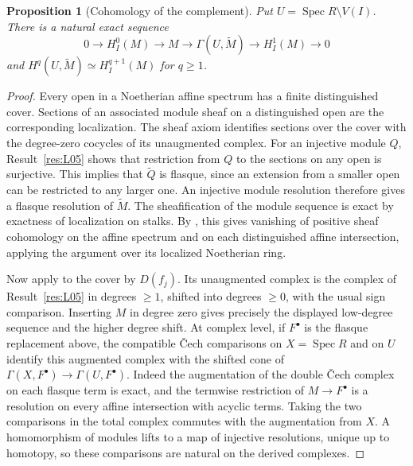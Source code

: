 \documentclass[11pt,oneside,openany]{book}
\newtheorem{proposition}[theorem]{Proposition}
\theoremstyle{definition}
\theoremstyle{remark}
\begin{document}
\begin{proposition}[Cohomology of the complement]\label{res:L10}
Put \(U=\operatorname{Spec} R\setminus V(I)\).
There is a natural exact sequence
\[
 0\to H_I^0(M)\to M\to\Gamma(U,\widetilde M)\to H_I^1(M)\to0
\]
and \(H^q(U,\widetilde M)\simeq H_I^{q+1}(M)\) for \(q\geq1\).
\end{proposition}
\begin{proof}
Every open in a Noetherian affine spectrum has a finite distinguished
cover. Sections of an associated module sheaf on a distinguished open
are the corresponding localization. The sheaf axiom identifies sections
over the cover with the degree-zero cocycles of its unaugmented complex.
For an injective module \(Q\), Result~\ref{res:L05} shows that restriction
from \(Q\) to the sections on any open is surjective. This implies
that \(\widetilde Q\) is flasque, since an extension from a smaller
open can be restricted to any larger one. An injective module
resolution therefore gives a flasque resolution of \(\widetilde M\).
The sheafification of the module sequence is exact by exactness of
localization on stalks. By \cite[H01]{homological}, this gives
vanishing of positive sheaf cohomology on the affine spectrum and
on each distinguished affine intersection, applying the argument
over its localized Noetherian ring.

Now apply \cite[H02--H04]{homological} to the cover by \(D(f_j)\).
Its unaugmented complex is the complex of Result~\ref{res:L05}
in degrees \(\geq1\), shifted into degrees \(\geq0\), with the
usual sign comparison. Inserting \(M\) in degree zero gives precisely
the displayed low-degree sequence and the higher degree shift.
At complex level, if \(F^\bullet\) is the flasque replacement above,
the compatible \v{C}ech comparisons on \(X=\operatorname{Spec}R\) and
on \(U\) identify this augmented complex with the shifted cone of
\(\Gamma(X,F^\bullet)\to\Gamma(U,F^\bullet)\).
Indeed the augmentation of the double \v{C}ech complex on each flasque
term is exact, and the termwise restriction of \(M\to F^\bullet\)
is a resolution on every affine intersection with acyclic terms.
Taking the two comparisons in the total complex commutes with
the augmentation from \(X\). A homomorphism of modules lifts to a
map of injective resolutions, unique up to homotopy, so these
comparisons are natural on the derived complexes.
\end{proof}
\end{document}
